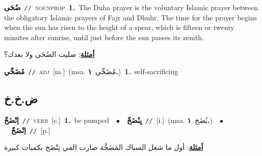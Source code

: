 \documentclass[10pt,a4paper,twoside]{article} %
\begin{document}
\begin{multicols}{2}
{{{{{{{{{\setlength\topsep{0pt}\textbf{\foreignlanguage{arabic}{ضُحَى}}\ {\color{gray}\texttt{//}\color{black}}\ \textsc{noun\textunderscore prop}\ \textbf{1.}~The Duha prayer is the voluntary Islamic prayer between the obligatory Islamic prayers of Fajr and Dhuhr. The time for the prayer begins when the sun has risen to the height of a spear, which is fifteen or twenty minutes after sunrise, until just before the sun passes its zenith.\  \begin{flushright}\color{gray}\foreignlanguage{arabic}{\textbf{\underline{\foreignlanguage{arabic}{أمثلة}}}: صليت الضُحَى ولا بعدك؟}\end{flushright}\color{black}} \vspace{2mm}

{\setlength\topsep{0pt}\textbf{\foreignlanguage{arabic}{مُضَحِّي}}\ {\color{gray}\texttt{//}\color{black}}\ \textsc{adj}\ [m.]\ \color{gray}(msa. \foreignlanguage{arabic}{مُضَحِّي}~\foreignlanguage{arabic}{\textbf{١.}})\color{black}\ \textbf{1.}~self-sacrificing\ 

\vspace{-3mm}
\subsection*{\color{blue}\foreignlanguage{arabic}{ض.خ.خ}\color{blue}{}} 

{\setlength\topsep{0pt}\textbf{\foreignlanguage{arabic}{اِنْضَخّ}}\ {\color{gray}\texttt{//}\color{black}}\ \textsc{verb}\ [c.]\ \textbf{1.}~be pumped\ \ $\bullet$\ \ \setlength\topsep{0pt}\textbf{\foreignlanguage{arabic}{يِنْضَخّ}}\ {\color{gray}\texttt{//}\color{black}}\ [i.]\ \color{gray}(msa. \foreignlanguage{arabic}{يُضَخ}~\foreignlanguage{arabic}{\textbf{١.}})\color{black}\ \ $\bullet$\ \ \setlength\topsep{0pt}\textbf{\foreignlanguage{arabic}{اِنْضَخّ}}\ {\color{gray}\texttt{//}\color{black}}\ [p.]\  \begin{flushright}\color{gray}\foreignlanguage{arabic}{\textbf{\underline{\foreignlanguage{arabic}{أمثلة}}}: أول ما شغل السباك المَضَخَّة صارت المي تِنْضَخ بكميات كبيرة}\end{flushright}\color{black}} \vspace{2mm}

}}}}}}}}}
\end{multicols}
\end{document}
